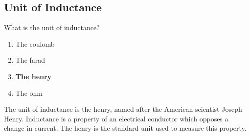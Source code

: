 \subsection{Unit of Inductance}
\label{T5C04}

\begin{tcolorbox}[colback=gray!10!white,colframe=black!75!black,title=T5C04]
What is the unit of inductance?
\begin{enumerate}[noitemsep]
    \item The coulomb
    \item The farad
    \item \textbf{The henry}
    \item The ohm
\end{enumerate}
\end{tcolorbox}

The unit of inductance is the henry, named after the American scientist Joseph Henry. Inductance is a property of an electrical conductor which opposes a change in current. The henry is the standard unit used to measure this property.